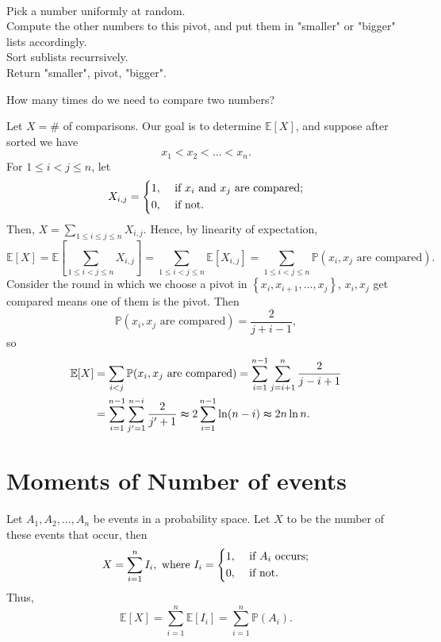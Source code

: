 \begin{eg}
\quad \\
    \begin{algorithm}[H]
    \caption{Quick Sort}
        Pick a number uniformly at random. \\
        Compute the other numbers to this pivot, and put them in "smaller" or "bigger" lists accordingly. \\
        Sort sublists recurrsively. \\
        Return "smaller", pivot, "bigger". 
    \end{algorithm}

    How many times do we need to compare two numbers?
\end{eg}

\begin{explanation}
    Let \(X = \#\) of comparisons. Our goal is to determine \(\mathbb{E} [X]\), and suppose after sorted we have
    \[
        x_1 < x_2 < \dots < x_n.
    \]
    For \(1 \le i < j \le n\), let 
    \[
        X_{i, j} = \begin{dcases}
            1, &\text{ if } x_i \text{ and } x_j \text{ are compared}    ;\\
            0, &\text{ if not}.
        \end{dcases}
    \]   
    Then, \(X = \sum_{1 \le i \le j \le n} X_{i, j} \). Hence, by linearity of expectation,
    \[
        \mathbb{E} [X] = \mathbb{E} \left[ \sum_{1 \le i < j \le n} X_{i, j}  \right] = \sum_{1 \le i < j \le n} \mathbb{E} [X_{i, j}] = \sum_{1 \le i < j \le n} \mathbb{P}(x_i, x_j \text{ are compared}).   
    \] 
    Consider the round in which we choose a pivot in \(\left\{ x_i, x_{i+1}, \dots , x_j \right\} \), \(x_i, x_j\) get compared means one of them is the pivot. Then
    \[
        \mathbb{P} (x_i, x_j \text{ are compared}) = \frac{2}{j + i - 1},
    \]  
    so 
    \begin{align*}
        \mathbb{E} [X] &= \sum_{i < j} \mathbb{P} (x_i, x_j \text{ are compared}) = \sum_{i=1}^{n-1} \sum_{j = i + 1}^n \frac{2}{j - i + 1} \\
        &= \sum_{i=1}^{n-1} \sum_{j^{\prime} = 1}^{n - i} \frac{2}{j^{\prime} + 1} \thickapprox 2 \sum_{i=1}^{n - 1} \ln (n - i) \thickapprox 2 n \ln n.      
    \end{align*}
\end{explanation}

\section{Moments of Number of events}
Let \(A_1, A_2, \dots , A_n\) be events in a probability space. Let \(X\) to be the number of these events that occur, then 
\[
    X = \sum_{i=1}^n I_i, \text{ where } I_i = \begin{dcases}
        1, &\text{ if } A_i \text{ occurs}  ;\\
        0, &\text{ if not}.
    \end{dcases}  
\]  
Thus,
\[
    \mathbb{E} [X] = \sum_{i=1}^n \mathbb{E} [I_i] = \sum_{i=1}^n \mathbb{P} (A_i).  
\]

